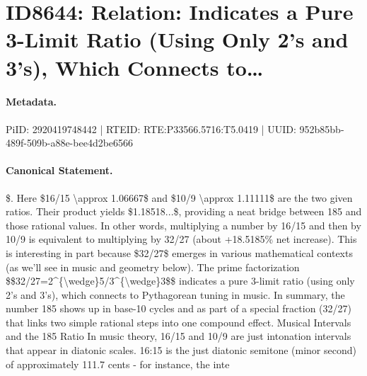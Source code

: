 \section*{ID8644: Relation: Indicates a Pure 3-Limit Ratio (Using Only 2's and 3's), Which Connects to…}
\paragraph{Metadata.}
PiID: 2920419748442 | RTEID: RTE:P33566.5716:T5.0419 | UUID: 952b85bb-489f-509b-a88e-bee4d2be6566

\paragraph{Canonical Statement.}
\$. Here \$16/15 \textbackslash{}approx 1.06667\$ and \$10/9 \textbackslash{}approx 1.11111\$ are the two given ratios. Their product yields \$1.18518...\$, providing a neat bridge between 185 and those rational values. In other words, multiplying a number by 16/15 and then by 10/9 is equivalent to multiplying by 32/27 (about +18.5185\% net increase). This is interesting in part because \$32/27\$ emerges in various mathematical contexts (as we'll see in music and geometry below). The prime factorization \$\$32/27=2\textasciicircum{}\{\textbackslash{}wedge\}5/3\textasciicircum{}\{\textbackslash{}wedge\}3\$\$ indicates a pure 3-limit ratio (using only 2's and 3's), which connects to Pythagorean tuning in music. In summary, the number 185 shows up in base-10 cycles and as part of a special fraction (32/27) that links two simple rational steps into one compound effect. Musical Intervals and the 185 Ratio In music theory, 16/15 and 10/9 are just intonation intervals that appear in diatonic scales. 16:15 is the just diatonic semitone (minor second) of approximately 111.7 cents - for instance, the inte

